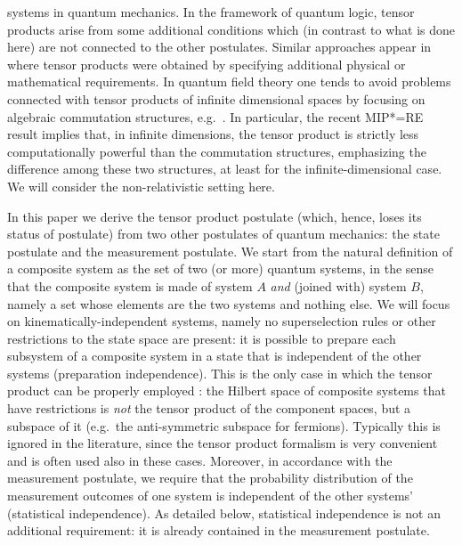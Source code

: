 \documentclass[aps,prl,amsmath,amssymb,twocolumn,nofootinbib]{revtex4}
\theoremstyle{plain}
\theoremstyle{definition}
\theoremstyle{remark}
\begin{document}
systems in quantum mechanics. In the framework of quantum logic,
tensor products arise from some additional conditions \cite{matolcsi}
which (in contrast to what is done here) are not connected to the
other postulates. Similar approaches appear in \cite{marmo,aerts}
where tensor products were obtained by specifying additional physical
or mathematical requirements. In quantum field theory one tends to
avoid problems connected with tensor products of infinite dimensional
spaces by focusing on algebraic commutation structures,
e.g.~\cite{giddins,roos}.  In particular, the recent MIP*=RE result
\cite{mipre} implies that, in infinite dimensions, the tensor product
is strictly less computationally powerful than the commutation
structures, emphasizing the difference among these two structures, at
least for the infinite-dimensional case. We will consider the
non-relativistic setting here.

In this paper we derive the tensor product postulate (which, hence,
loses its status of postulate) from two other postulates of quantum
mechanics: the state postulate and the measurement postulate. We start
from the natural definition of a composite system as the set of two
(or more) quantum systems, in the sense that the composite system is
made of system $A$ {\em and} (joined with) system $B$, namely a set
whose elements are the two systems and nothing else. We will focus on
kine\-mati\-cal\-ly-inde\-pen\-dent systems, namely no superselection rules or
other restrictions to the state space are present: it is possible to
prepare each subsystem of a composite system in a state that is
independent of the other systems (preparation independence).  This is
the only case in which the tensor product can be properly employed
\cite{susskind,zanardi,zanardilloyd}: the Hilbert space of composite
systems that have restrictions is {\em not} the tensor product of the
component spaces, but a subspace of it (e.g.~the anti-symmetric
subspace for fermions). Typically this is ignored in the literature,
since the tensor product formalism is very convenient and is often
used also in these cases. Moreover, in accordance with the measurement
postulate, we require that the probability distribution of the
measurement outcomes of one system is independent of the other systems' (statistical
independence). As detailed below, statistical independence is not an
additional requirement: it is already contained in the measurement
postulate.
\end{document}
